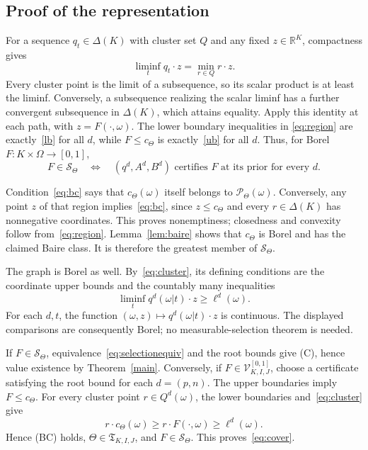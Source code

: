\documentclass[11pt,a4paper]{article}
\theoremstyle{definition}
\theoremstyle{remark}
\newcommand{\R}{\mathbb R}
\newcommand{\VV}{\mathcal V}
\begin{document}
\subsection{Proof of the representation}

For a sequence $q_t\in\Delta(K)$ with cluster set $Q$ and any fixed
$z\in\R^K$, compactness gives
\begin{equation}\label{eq:cluster}
 \liminf_t q_t\cdot z=\min_{r\in Q}r\cdot z.
\end{equation}
Every cluster point is the limit of a subsequence, so its scalar
product is at least the liminf. Conversely, a subsequence realizing
the scalar liminf has a further convergent subsequence in $\Delta(K)$,
which attains equality. Apply this identity at each path, with
$z=F(\cdot,\omega)$. The lower boundary inequalities in
\eqref{eq:region} are exactly~\eqref{lb} for all $d$, while
$F\leq c_\Theta$ is exactly~\eqref{ub} for all $d$. Thus, for Borel $F:K\times\Omega\to[0,1]$,
\begin{equation}\label{eq:selectionequiv}
 F\in\mathcal S_\Theta
 \quad\Longleftrightarrow\quad
 (q^d,A^d,B^d)\text{ certifies }F\text{ at its prior for every }d.
\end{equation}

Condition~\eqref{eq:bc} says that $c_\Theta(\omega)$ itself belongs
to $\mathcal P_\Theta(\omega)$. Conversely, any point $z$ of that
region implies~\eqref{eq:bc}, since $z\leq c_\Theta$ and every
$r\in\Delta(K)$ has nonnegative coordinates. This proves
nonemptiness; closedness and convexity follow from~\eqref{eq:region}.
Lemma~\ref{lem:baire} shows that $c_\Theta$ is Borel and has the
claimed Baire class. It is therefore the greatest member of
$\mathcal S_\Theta$.

The graph is Borel as well. By~\eqref{eq:cluster}, its defining
conditions are the coordinate upper bounds and the countably many
inequalities
\[
 \liminf_t q^d(\omega|t)\cdot z\geq\ell^d(\omega).
\]
For each $d,t$, the function $(\omega,z)\mapsto q^d(\omega|t)\cdot z$
is continuous. The displayed comparisons are consequently Borel;
no measurable-selection theorem is needed.

If $F\in\mathcal S_\Theta$, equivalence~\eqref{eq:selectionequiv}
and the root bounds give (C), hence value existence by
Theorem~\ref{main}. Conversely, if $F\in\VV^{[0,1]}_{K,I,J}$,
choose a certificate satisfying the root bound for each $d=(p,n)$.
The upper boundaries imply $F\leq c_\Theta$. For every cluster point
$r\in Q^d(\omega)$, the lower boundaries and~\eqref{eq:cluster} give
\[
 r\cdot c_\Theta(\omega)\geq r\cdot F(\cdot,\omega)
                                      \geq\ell^d(\omega).
\]
Hence (BC) holds, $\Theta\in\mathfrak T_{K,I,J}$, and
$F\in\mathcal S_\Theta$. This proves~\eqref{eq:cover}.
\end{document}
